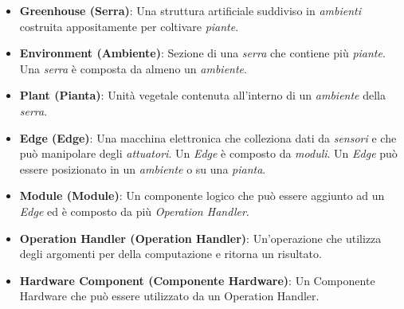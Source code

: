 \begin{itemize}
	\item \textbf{Greenhouse (Serra)}: Una struttura artificiale suddiviso in \textit{ambienti} costruita appositamente per coltivare \textit{piante}.
	\item \textbf{Environment (Ambiente)}: Sezione di una \textit{serra} che contiene più \textit{piante}. Una \textit{serra} è composta da almeno un \textit{ambiente}.
	\item \textbf{Plant (Pianta)}: Unità vegetale contenuta all’interno di un \textit{ambiente} della \textit{serra}.
	\item \textbf{Edge (Edge)}: Una macchina elettronica che colleziona dati da \textit{sensori} e che può manipolare degli \textit{attuatori}. Un \textit{Edge} è composto da \textit{moduli}. Un \textit{Edge} può essere posizionato in un \textit{ambiente} o su una \textit{pianta}.
	\item \textbf{Module (Module)}: Un componente logico che può essere aggiunto ad un \textit{Edge} ed è composto da più \textit{Operation Handler}.
	\item \textbf{Operation Handler (Operation Handler)}: Un'operazione che utilizza degli argomenti per della computazione e ritorna un risultato.
	\item \textbf{Hardware Component (Componente Hardware)}: Un Componente Hardware che può essere utilizzato da un Operation Handler.
\end{itemize}
